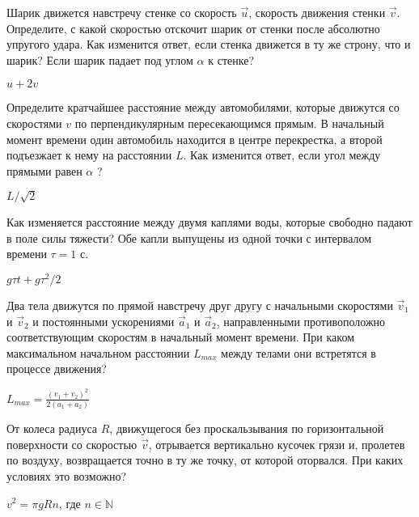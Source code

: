 \begin{ex}
Шарик движется навстречу стенке со скорость $\vec u$, скорость движения стенки $\vec v$. 
Определите, с какой скоростью отскочит шарик от стенки после абсолютно упругого удара. 
Как изменится ответ, если стенка движется в ту же строну, что и шарик? 
Если шарик падает под углом $ \alpha $ к стенке?
\begin{ans}
$u + 2v$
\end{ans}
\end{ex}

\begin{ex}
Определите кратчайшее расстояние между автомобилями, которые движутся со скоростями $v$ по перпендикулярным пересекающимся прямым. 
В начальный момент времени один автомобиль находится в центре перекрестка, а второй подъезжает к нему на расстоянии $L$. 
Как изменится ответ, если угол между прямыми равен $ \alpha $ ?
\begin{ans}
$L/\sqrt{2}$
\end{ans}
\end{ex}

\begin{ex}
Как изменяется расстояние между двумя каплями воды, которые свободно падают в поле силы тяжести? 
Обе капли выпущены из одной точки с интервалом времени $\tau = 1$ с.
\begin{ans}
$g \tau t + g \tau^2 / 2$
\end{ans}
\end{ex}

\begin{ex}
Два тела движутся по прямой навстречу друг другу с начальными скоростями $\vec{v}_1$ и $\vec{v}_2$ и 
постоянными ускорениями $\vec{a}_1$ и $\vec{a}_2$, направленными противоположно соответствующим скоростям в начальный момент времени. 
При каком максимальном начальном расстоянии $L_{max}$ между телами они встретятся в процессе движения?
\begin{ans}
$L_{max} = \frac{(v_1 + v_2)^2}{2(a_1+a_2)}$
\end{ans}
\end{ex}

\begin{ex}
От колеса радиуса $R$, движущегося без проскальзывания по горизонтальной поверхности со скоростью $\vec v$,  отрывается вертикально кусочек грязи и, пролетев по воздуху, возвращается точно в ту же точку, от которой оторвался. При каких условиях это возможно?
\begin{ans}
$v^2 = \pi g R n$, где $n \in \mathbb{N}$
\end{ans}
\end{ex}

